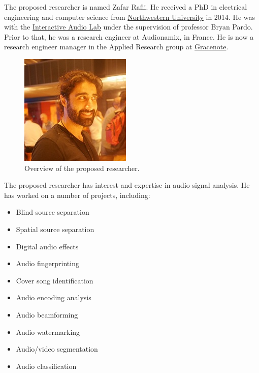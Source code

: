 \documentclass{article}
\begin{document}
\nocite{inbook_pardo_2018}
\nocite{inbook_rafii_2014}

\nocite{report_rafii_2009}

\nocite{misc_mcdermott_oct2012}

\nocite{online_rafii_2019}
\nocite{online_rafii_2017}

The proposed researcher is named Zafar Rafii. He received a PhD in electrical engineering and computer science from \href{https://www.northwestern.edu/}{Northwestern University} in 2014. He was with the \href{https://interactiveaudiolab.github.io/}{Interactive Audio Lab} under the supervision of professor Bryan Pardo. Prior to that, he was a research engineer at Audionamix, in France. He is now a research engineer manager in the Applied Research group at \href{https://www.gracenote.com/}{Gracenote}.

\begin{figure}[htb]
\centering
\includegraphics[width=0.5\columnwidth]{Images/zafar.jpg}
\caption{Overview of the proposed researcher.}
\label{fig:zafar}
\end{figure}

The proposed researcher has interest and expertise in audio signal analysis. He has worked on a number of projects, including:
\begin{itemize}[noitemsep,topsep=0pt]
\item Blind source separation
\item Spatial source separation
\item Digital audio effects
\item Audio fingerprinting
\item Cover song identification
\item Audio encoding analysis
\item Audio beamforming
\item Audio watermarking
\item Audio/video segmentation
\item Audio classification
\end{itemize}
\end{document}
